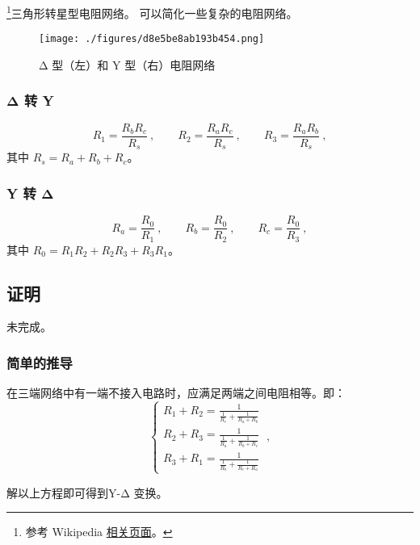 
\begin{issues}
\issueDraft
\end{issues}

\footnote{参考 Wikipedia \href{https://en.wikipedia.org/wiki/Y-\%CE\%94_transform}{相关页面}。}三角形转星型电阻网络。 可以简化一些复杂的电阻网络。

\begin{figure}[ht]
\centering
\texttt{[image: ./figures/d8e5be8ab193b454.png]}
\caption{Δ 型（左）和 Y 型（右）电阻网络} \label{fig_Tri2St_1}
\end{figure}

\subsubsection{Δ 转 Y}
\begin{equation}
R_1 = \frac{R_b R_c}{R_s} ~,\qquad
R_2 = \frac{R_a R_c}{R_s} ~,\qquad
R_3 = \frac{R_a R_b}{R_s}~,
\end{equation}
其中 $R_s = R_a + R_b + R_c$。

\subsubsection{Y 转 Δ}
\begin{equation}
R_a = \frac{R_0}{R_1}~, \qquad
R_b = \frac{R_0}{R_2} ~,\qquad
R_c = \frac{R_0}{R_3}~,
\end{equation}
其中 $R_0 = R_1 R_2 + R_2 R_3 + R_3 R_1$。

\subsection{证明}
未完成。
\subsubsection{简单的推导}
在三端网络中有一端不接入电路时，应满足两端之间电阻相等。即：
\begin{equation}
\left\{\begin{matrix}R_1+R_2=\frac{1}{\frac{1}{R_c}+\frac{1}{R_a+R_b}}\\R_2+R_3=\frac{1}{\frac{1}{R_a}+\frac{1}{R_b+R_c}}\\R_3+R_1=\frac{1}{\frac{1}{R_b}+\frac{1}{R_c+R_a}}\end{matrix}\right.~,
\end{equation}

解以上方程即可得到Y-Δ 变换。
